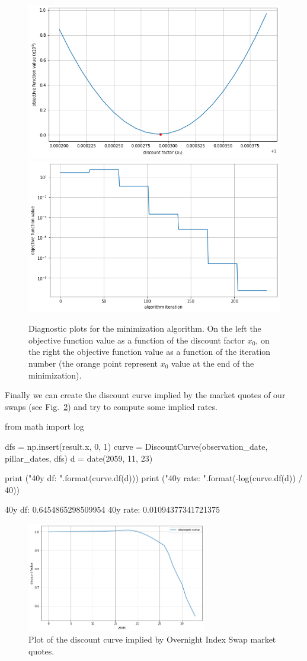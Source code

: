 \begin{figure}[htb]
	\centering
	\includegraphics[width=0.45\linewidth]{figures/obj_func.png}
	\includegraphics[width=0.45\linewidth]{figures/obj_func_iter.png}
	\caption{Diagnostic plots for the minimization algorithm. On the left the objective function value as a function of the discount factor $x_0$, on the right the objective function value as a function of the iteration number (the orange point represent $x_0$ value at the end of the minimization).}
	\label{fig:minimization_diagnostic}
\end{figure}

Finally we can create the discount curve implied by the market quotes of
our swaps (see Fig.~\ref{fig:discount_curve}) and try to compute some implied rates.

\begin{ipython}
from math import log

dfs = np.insert(result.x, 0, 1)
curve = DiscountCurve(observation_date, pillar_dates, dfs)
d = date(2059, 11, 23)

print ("40y df: {}".format(curve.df(d)))
print ("40y rate: {}".format(-log(curve.df(d)) / 40))
\end{ipython}
\begin{ioutput}
40y df: 0.6454865298509954
40y rate: 0.01094377341721375
\end{ioutput}

\begin{figure}[htb]
	\centering
	\includegraphics[width=0.7\textwidth]{figures/example_discount_curve.png}
	\caption{Plot of the discount curve implied by Overnight Index Swap market quotes.}
	\label{fig:discount_curve}
\end{figure}

